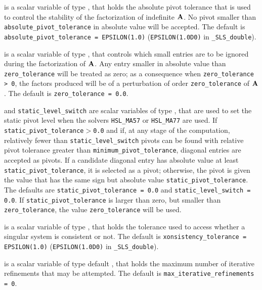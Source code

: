 \documentclass{galahad}
\newcommand{\packagename}{SLS}
\newcommand{\fullpackagename}{\libraryname\_\-\packagename}
\begin{document}
\begin{description}
 is a scalar variable of type \realdp, that
holds the absolute pivot tolerance that is used to control the
stability of the factorization of indefinite ${\mathbf{A}}$.
No pivot smaller than {\tt absolute\_pivot\_tolerance} in
absolute value will be accepted.
The default is {\tt absolute\_pivot\_\-tolerance = EPSILON(1.0)}
({\tt EPSILON(1.0D0)} in {\tt \fullpackagename\_double}).

 is a scalar variable of type \realdp, that
controls which small entries are to be ignored during the factorization
of ${\mathbf{A}}$. Any entry smaller in absolute value than
{\tt zero\_\-tolerance} will be treated as zero; as a consequence when
{\tt zero\_tolerance > 0}, the factors produced will be of a perturbation
of order {\tt zero\_tolerance} of ${\mathbf{A}}$.
The default is {\tt zero\_tolerance = 0.0}.

 and {\tt static\_level\_switch} are
scalar variables of type \realdp, that are used to set the static pivot
level when the solvers {\tt HSL\_MA57} or {\tt HSL\_MA77} are used.
If {\tt static\_pivot\_tolerance$>$0.0} and if,
at any stage of the computation, relatively fewer
than {\tt static\_level\_\-switch}
pivots can be found with relative pivot tolerance greater than
{\tt minimum\_pivot\_tolerance},  diagonal entries are accepted as pivots. If
a candidate diagonal entry has absolute value
at least {\tt static\_pivot\_tolerance}, it is
selected as a pivot; otherwise, the pivot is given the value
that has the same sign but absolute value {\tt static\_pivot\_tolerance}.
The defaults are {\tt static\_pivot\_tolerance = 0.0} and
{\tt static\_level\_switch = 0.0}.
If {\tt static\_pivot\_tolerance}
is larger than zero, but smaller than {\tt zero\_tolerance},
the value {\tt zero\_\-tolerance} will be used.

 is a scalar variable of type \realdp, that holds
the tolerance used to access whether a singular system is consistent or not.
The default is {\tt xonsistency\_\-tolerance = EPSILON(1.0)}
({\tt EPSILON(1.0D0)} in {\tt \fullpackagename\_double}).

 is a scalar variable of type default
\integer, that holds
the maximum number of iterative refinements that may be attempted.
The default is {\tt max\_iterative\_refinements = 0}.


\end{description}
\end{document}
